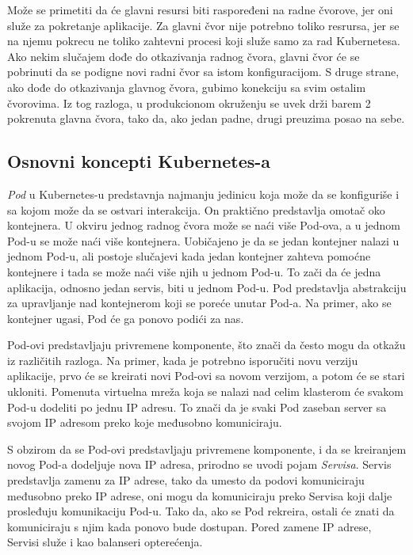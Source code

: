Može se primetiti da će glavni resursi biti raspoređeni na radne čvorove, jer oni služe za pokretanje 
aplikacije. Za glavni čvor nije potrebno toliko resrursa, jer se na njemu pokrecu ne toliko zahtevni procesi 
koji služe samo za rad Kubernetesa. Ako nekim slučajem dođe do otkazivanja radnog čvora, glavni čvor 
će se pobrinuti da se podigne novi radni čvor sa istom konfiguracijom. S druge strane, ako dođe do 
otkazivanja glavnog čvora, gubimo konekciju sa svim ostalim čvorovima. Iz tog razloga, u produkcionom 
okruženju se uvek drži barem 2 pokrenuta glavna čvora, tako da, ako jedan padne, drugi preuzima 
posao na sebe.

\subsection{Osnovni koncepti Kubernetes-a}
{\em Pod} u Kubernetes-u predstavnja najmanju jedinicu koja može da se konfiguriše i sa kojom može da 
se ostvari interakcija. On praktično predstavlja omotač oko kontejnera. U okviru jednog radnog čvora 
može se naći više Pod-ova, a u jednom Pod-u se može naći više kontejnera. Uobičajeno je da se jedan 
kontejner nalazi u jednom Pod-u, ali postoje slučajevi kada jedan kontejner zahteva pomoćne kontejnere 
i tada se može naći više njih u jednom Pod-u. To zači da će jedna aplikacija, odnosno jedan servis, 
biti u jednom Pod-u. Pod predstavlja abstrakciju za upravljanje nad kontejnerom koji se poreće unutar
Pod-a. Na primer, ako se kontejner ugasi, Pod će ga ponovo podići za nas. 

Pod-ovi predstavljaju privremene komponente, što znači da često mogu da otkažu iz različitih razloga. 
Na primer, kada je potrebno isporučiti novu verziju aplikacije, prvo će se kreirati novi Pod-ovi sa 
novom verzijom, a potom će se stari ukloniti. Pomenuta virtuelna mreža koja se nalazi nad celim 
klasterom će svakom Pod-u dodeliti po jednu IP adresu. To znači da je svaki Pod zaseban server sa 
svojom IP adresom preko koje međusobno komuniciraju.

S obzirom da se Pod-ovi predstavljaju privremene komponente, i da se kreiranjem novog Pod-a dodeljuje 
nova IP adresa, prirodno se uvodi pojam {\em Servisa}. Servis predstavlja zamenu za IP adrese, tako 
da umesto da podovi komuniciraju međusobno preko IP adrese, oni mogu da komuniciraju preko Servisa 
koji dalje prosleđuju komunikaciju Pod-u. Tako da, ako se Pod rekreira, ostali će znati da komuniciraju 
s njim kada ponovo bude dostupan. Pored zamene IP adrese, Servisi služe i kao balanseri opterećenja. 

